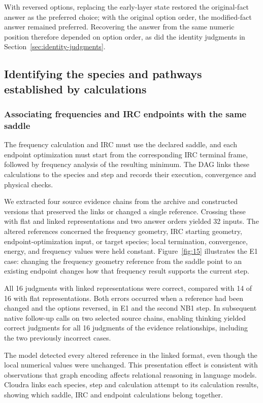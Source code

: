 With reversed options, replacing the early-layer state restored the original-fact answer as the preferred choice; with the original option order, the modified-fact answer remained preferred. Recovering the answer from the same numeric position therefore depended on option order, as did the identity judgments in Section~\ref{sec:identity-judgments}.

\subsection{Identifying the species and pathways established by calculations}

\subsubsection{Associating frequencies and IRC endpoints with the same saddle}

The frequency calculation and IRC must use the declared saddle, and each endpoint optimization must start from the corresponding IRC terminal frame, followed by frequency analysis of the resulting minimum. The DAG links these calculations to the species and step and records their execution, convergence and physical checks.

We extracted four source evidence chains from the archive and constructed versions that preserved the links or changed a single reference. Crossing these with flat and linked representations and two answer orders yielded 32 inputs. The altered references concerned the frequency geometry, IRC starting geometry, endpoint-optimization input, or target species; local termination, convergence, energy, and frequency values were held constant. Figure~\ref{fig:15} illustrates the E1 case: changing the frequency geometry reference from the saddle point to an existing endpoint changes how that frequency result supports the current step.

All 16 judgments with linked representations were correct, compared with 14 of 16 with flat representations. Both errors occurred when a reference had been changed and the options reversed, in E1 and the second NB1 step. In subsequent native follow-up calls on two selected source chains, enabling thinking yielded correct judgments for all 16 judgments of the evidence relationships, including the two previously incorrect cases. 

The model detected every altered reference in the linked format, even though the local numerical values were unchanged. This presentation effect is consistent with observations that graph encoding affects relational reasoning in language models.\citep{ref17} Cloudra links each species, step and calculation attempt to its calculation results, showing which saddle, IRC and endpoint calculations belong together.

